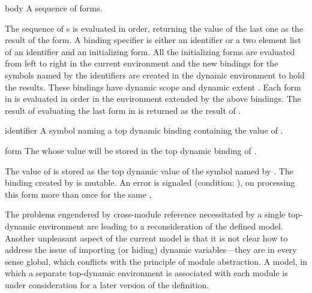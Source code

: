 \begin{optDefinition}
\begin{arguments}
    \item[body] A sequence of forms.
\end{arguments}
%
\result%
The sequence of s is evaluated in order, returning the value of the
last one as the result of the  form.
%
\remarks%
A binding specifier is either an identifier or a two element list of an
identifier and an initializing form.  All the initializing forms are evaluated
from left to right in the current environment and the new bindings for the
symbols named by the identifiers are created in the dynamic environment to hold
the results.  These bindings have dynamic scope and dynamic extent
.  Each
form in  is evaluated in order in the environment extended by the
above bindings.  The result of evaluating the last form in  is
returned as the result of .

%
\Syntax
{}%
%
\begin{arguments}
    \item[identifier] A symbol naming a top dynamic binding containing the value
    of .

    \item[form] The  whose value will be stored in the top dynamic
    binding of .
\end{arguments}
%
\remarks%
The value of  is stored as the top dynamic value of the symbol named
by  .  The binding created
by  is mutable.  An error is signaled (condition:
), on processing this form more than
once for the same .
%
\begin{note}
    The problems engendered by cross-module reference necessitated by a single
    top-dynamic environment are leading to a reconsideration of the defined
    model.  Another unpleasant aspect of the current model is that it is not
    clear how to address the issue of importing (or hiding) dynamic
    variables---they are in every sense global, which conflicts with the
    principle of module abstraction.  A model, in which a separate top-dynamic
    environment is associated with each module is under consideration for a
    later version of the definition.
\end{note}


\end{optDefinition}
